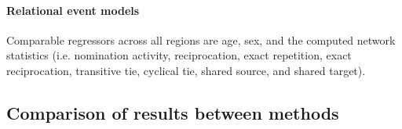 \paragraph{Relational event models} Comparable regressors across all regions are age, sex, and the computed network statistics (i.e. nomination activity, reciprocation, exact repetition, exact reciprocation, transitive tie, cyclical tie, shared source, and shared target).

 

\subsection{Comparison of results between methods}
\label{sec:discussion_methods}